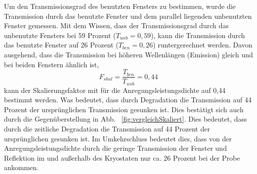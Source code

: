 %
Um den Transmissionsgrad des benutzten Fensters zu bestimmen, wurde die Transmission durch das benutzte Fenster und dem parallel liegenden unbenutzten Fenster gemessen. Mit dem Wissen, dass der Transmissionsgrad durch das unbenutzte Fensters bei 59 Prozent ($T_{unb} = 0,59$), kann die Transmission durch das benutzte Fenster auf 26 Prozent ($T_{ben} = 0,26$) runtergerechnet werden. 
Davon ausgehend, dass die Transmission bei höheren Wellenlängen (Emission) gleich und bei beiden Fenstern ähnlich ist,
%
\begin{equation}
  F_{skal} = \frac{ T_{ben} }{ T_{unb} } = 0,44\label{eq11}
\end{equation}
%
kann der Skalierungsfaktor mit für die Anregungsleistungsdichte auf 0,44 bestimmt werden. Was bedeutet, dass durch Degradation die Transmission auf 44 Prozent der ursprünglichen Transmission gesunken ist.
Dies bestätigt sich auch durch die Gegenüberstellung in Abb. ~\ref{fig:vergleichSkaliert}. Dies bedeutet, dass durch die zeitliche Degradation die Transmission auf 44 Prozent der ursprünglichen gesunken ist.
Im Umkehrschluss bedeutet dies, dass von der Anregungsleistungsdichte durch die geringe Transmission der Fenster und Reflektion im und außerhalb des Kryostaten nur ca. 26 Prozent bei der Probe ankommen. 